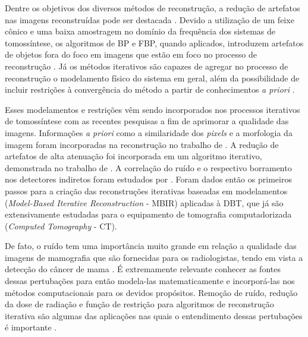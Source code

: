 Dentre os objetivos dos diversos métodos de reconstrução, a redução de artefatos nas imagens reconstruídas pode ser destacada \cite{hu2008image}. Devido a utilização de um feixe cônico e uma baixa amostragem no domínio da frequência dos sistemas de tomossíntese, os algoritmos de \acs{BP} e \acs{FBP}, quando aplicados, introduzem artefatos de objetos fora do foco em imagens que estão em foco no processo de reconstrução \cite[]{levakhina2013weighted, borges2017metal}. Já os métodos iterativos são capazes de agregar no processo de reconstrução o modelamento físico do sistema em geral, além da possibilidade de incluir restrições à convergência do método a partir de conhecimentos \textit{a priori} \cite{xu2015statistical,levakhina2013weighted}.

Esses modelamentos e restrições vêm sendo incorporados nos processos iterativos de tomossíntese com as recentes pesquisas a fim de aprimorar a qualidade das imagens. Informações \textit{a priori} como a similaridade dos \textit{pixels} e a morfologia da imagem foram incorporadas na reconstrução no trabalho de . A redução de artefatos de alta atenuação foi incorporada em um algoritmo iterativo, demonstrada no trabalho de . A correlação do ruído e o respectivo borramento nos detectores indiretos foram estudados por . Foram dados então os primeiros passos para a criação das reconstruções iterativas baseadas em modelamentos (\textit{Model-Based Iterative Reconstruction }- \acs{MBIR}) aplicadas à \acs{DBT}, que já são extensivamente estudadas para o equipamento de tomografia computadorizada (\textit{Computed Tomography} - \acs{CT}).    

De fato, o ruído tem uma importância muito grande em relação a qualidade das imagens de mamografia que são fornecidas para os radiologistas, tendo em vista a detecção do câncer de mama \cite{haus2000screen,huda2003experimental,ruschin2007dose, saunders2007does, samei2007digital, mackenzie2016relationship}. É extremamente relevante conhecer as fontes dessas pertubações para então modela-las matematicamente e incorporá-las nos métodos computacionais para os devidos propósitos. Remoção de ruído, redução da dose de radiação e função de restrição para algoritmos de reconstrução iterativa são algumas das aplicações nas quais o entendimento dessas pertubações é importante \cite{wu2012dose, romualdo2013mammographic,borges2016method,borges2017pipeline,borges2017method,mackenzie2017characterisation,zheng2018detector}.


